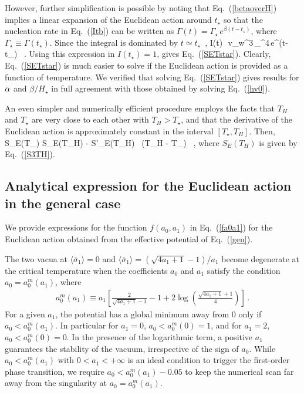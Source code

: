 \documentclass[a4paper,11pt]{article}
\begin{document}
However, further simplification is possible by noting that
Eq.~(\ref{betaoverH}) implies a linear expansion of the Euclidean 
action around $t_\star$ so that the nucleation rate in Eq.~(\ref{Itb})
can be written as $\Gamma(t) = \Gamma_\star \, e^{\beta(t-t_\star)}$, where $\Gamma_\star \equiv \Gamma(t_\star)$. 
Since the integral is dominated by $t \simeq t_\star$~\cite{Turner:1992tz},
\be
I(t) \,\pi \,v_{\rm w}^3\,{\Gamma_\star \over \beta^4}\,e^{\beta(t-t_\star)} \,   .
\ee
Using this expression in $I(t_\star) = 1$, gives Eq.~(\ref{SETstar}).
Clearly, Eq.~(\ref{SETstar}) is much easier to solve if 
the Euclidean action is provided as a function of temperature.
We verified that solving Eq.~(\ref{SETstar})  gives results for $\alpha$ and $\beta/H_\star$ 
 in full agreement with those obtained by solving Eq.~(\ref{hv0}).  


An even simpler and numerically efficient procedure employs the facts that $T_H$ and $T_\star$
are very close to each other with $T_H > T_\star$, and that the derivative of the Euclidean action is approximately constant in the interval
$[T_\star, T_H]$. Then, 
\be
S_E(T_\star) \simeq S_E(T_H) - S'_E(T_H) \, (T_H - T_\star) \,  ,
\ee
where $S_E(T_H)$ is given by  Eq.~(\ref{S3TH}). 


\subsection{Analytical expression for the Euclidean action in the general case}
\label{euclidapp}

We provide expressions for the function $f(a_0,a_1)$ in Eq.~(\ref{fa0a1}) for the
Euclidean action obtained from the effective potential of Eq.~(\ref{gen}).

The two   vacua at $\langle \bar{\sigma}_1 \rangle = 0$ and $\langle \bar{\sigma}_1 \rangle = (\sqrt{4 a_1 +1}-1)/a_1$ become degenerate at the critical temperature
when the coefficients $a_0$ and $a_1$ satisfy the condition $a_0 = a_0^m(a_1)$, where
\begin{eqnarray} \label{eq:critical_condition}
a_0^m(a_1) \equiv a_1 \left[ \frac{2}{\sqrt{4a_1 +1}-1} -1 + 2\log\left(\frac{\sqrt{4a_1+1}+1}{4}\right) \right]\,. 
\end{eqnarray}
For a given $a_1$, the potential has a global minimum away from 0 only if $a_0 < a_0^m (a_1)$.
In particular for $a_1=0$, $a_0 < a_0^m (0) = 1$, and for $a_1=2$, $a_0 < a_0^m (0) = 0$. 
In the presence of the logarithmic term, a positive $a_1$ guarantees the stability of the vacuum, irrespective of the sign of $a_0$.
While $a_0< a_0^m(a_1)$ with $0<a_1<+\infty$ is an ideal condition to trigger the first-order phase transition, we require $a_0< a_0^m(a_1)-0.05$ to keep the numerical scan far away from the singularity at $a_0= a_0^m(a_1)$.
\end{document}
